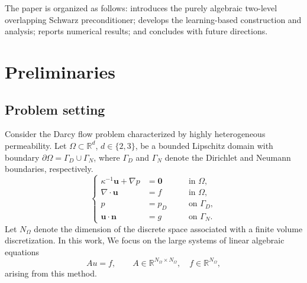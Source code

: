 \documentclass{article}
\theoremstyle{definition}
\theoremstyle{remark}
\begin{document}
The paper is organized as follows:  introduces the purely algebraic two-level overlapping Schwarz preconditioner;  develops the learning-based construction and analysis;  reports numerical results; and  concludes with future directions.






\section{Preliminaries}\label{pre}

\subsection{Problem setting}
Consider the Darcy flow problem characterized by highly heterogeneous permeability.
Let \(\Omega \subset \mathbb{R}^d\), \(d \in \{2,3\}\), be a bounded Lipschitz domain with boundary \(\partial\Omega = \Gamma_D \cup \Gamma_N\), where \(\Gamma_D\) and \(\Gamma_N\) denote the Dirichlet and Neumann boundaries, respectively.
\begin{equation}\label{eq:original_equation}
\left\{
\begin{aligned}
\kappa^{-1}\bm{u}+\nabla p &= \bm{0} \quad &&\text{in } \Omega,\\
\nabla \cdot \bm{u} &= f \quad &&\text{in } \Omega,\\
p &= p_D \quad &&\text{on } \Gamma_D,\\
\bm{u}\cdot \bm{n} &= g \quad &&\text{on } \Gamma_N.
\end{aligned}
\right.
\end{equation}
Let \(N_\Omega\) denote the dimension of the discrete space associated with a finite volume discretization.
In this work, We focus on the large systems of linear algebraic equations
\[
A u = f, \qquad A \in \mathbb{R}^{N_\Omega \times N_\Omega}, \quad f \in \mathbb{R}^{N_\Omega},
\]
arising from this method.
\end{document}
